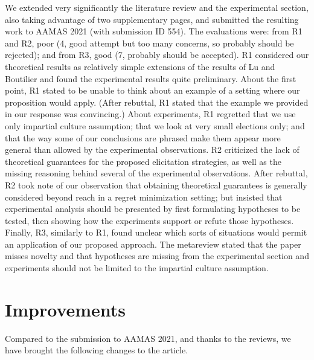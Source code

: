 \documentclass[version=3.21, pagesize, twoside=off, bibliography=totoc, DIV=calc, fontsize=12pt, a4paper]{scrartcl}
\begin{document}
We extended very significantly the literature review and the experimental section, also taking advantage of two supplementary pages, and submitted the resulting work to AAMAS 2021 (with submission ID 554). The evaluations were: from R1 and R2, poor (4, good attempt but too many concerns, so probably should be rejected); and from R3, good (7, probably should be accepted). R1 considered our theoretical results as relatively simple extensions of the results of Lu and Boutilier and found the experimental results quite preliminary. About the first point, R1 stated to be unable to think about an example of a setting where our proposition would apply. 
(After rebuttal, R1 stated that the example we provided in our response was convincing.) 
About experiments, R1 regretted that we use only impartial culture assumption; that we look at very small elections only; and that the way some of our conclusions are phrased make them appear more general than allowed by the experimental observations. 
R2 criticized the lack of theoretical guarantees for the proposed elicitation strategies, as well as the missing reasoning behind several of the experimental observations. After rebuttal, R2 took note of our observation that obtaining theoretical guarantees is generally considered beyond reach in a regret minimization setting; but insisted that experimental analysis should be presented by first formulating hypotheses to be tested, then showing how the experiments support or refute those hypotheses. Finally, R3, similarly to R1, found unclear which sorts of situations would permit an application of our proposed approach.
The metareview stated that the paper misses novelty and that hypotheses are missing from the experimental section and experiments should not be limited to the impartial culture assumption.

\section{Improvements}
Compared to the submission to AAMAS 2021, and thanks to the reviews, we have brought the following changes to the article.
\end{document}
